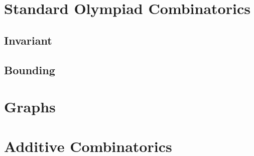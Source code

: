 \documentclass[11pt]{scrartcl}
\theoremstyle{plain} %
\theoremstyle{definition}
\theoremstyle{remark}
\newtheorem{remark}{Remark}
\theoremstyle{empty}
\theoremstyle{empty}
\theoremstyle{empty}
\theoremstyle{empty}
\theoremstyle{empty}
\theoremstyle{empty}
\theoremstyle{empty}
\begin{document}
\begin{problem}
  
\end{problem}





\section{Standard Olympiad Combinatorics}



\subsection{Invariant}

\subsection{Bounding}

\section{Graphs}

\section{Additive Combinatorics}
\end{document}
